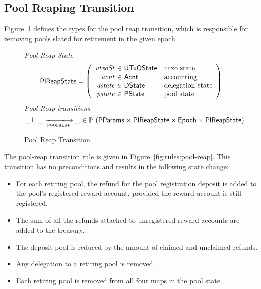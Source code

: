 \clearpage

\subsection{Pool Reaping Transition}
\label{sec:pool-reap}

Figure~\ref{fig:ts-types:pool-reap} defines the types for the pool reap transition,
which is responsible for removing pools slated for retirement in the given epoch.

\begin{figure}[htb]
  \emph{Pool Reap State}
  \begin{equation*}
    \PlReapState =
    \left(
      \begin{array}{r@{~\in~}ll}
        \var{utxoSt} & \UTxOState & \text{utxo state}\\
        \var{acnt} & \Acnt & \text{accounting}\\
        \var{dstate} & \DState & \text{delegation state}\\
        \var{pstate} & \PState & \text{pool state}\\
      \end{array}
    \right)
  \end{equation*}
  \emph{Pool Reap transitions}
  \begin{equation*}
    \_ \vdash \_ \trans{poolreap}{\_} \_ \in
    \powerset (\PParams \times \PlReapState \times \Epoch \times \PlReapState)
  \end{equation*}
  \caption{Pool Reap Transition}
  \label{fig:ts-types:pool-reap}
\end{figure}


The pool-reap transition rule is given in Figure~\ref{fig:rules:pool-reap}.
This transition has no preconditions and results in the following state change:

\begin{itemize}
  \item For each retiring pool, the refund for the pool registration deposit is added to the
    pool's registered reward account, provided the reward account is still registered.
  \item The sum of all the refunds attached to unregistered reward accounts are added to the
    treasury.
  \item The deposit pool is reduced by the amount of claimed and unclaimed refunds.
  \item Any delegation to a retiring pool is removed.
  \item Each retiring pool is removed from all four maps in the pool state.
\end{itemize}

